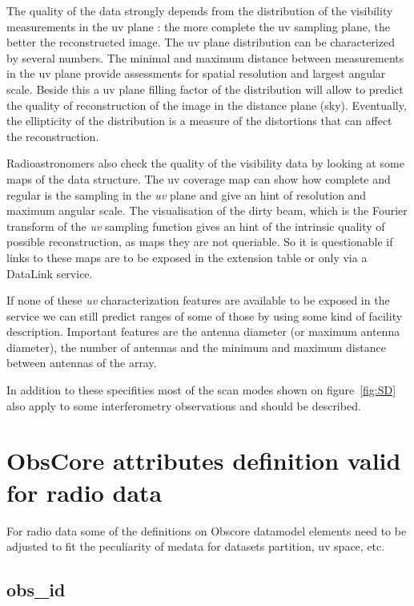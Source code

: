 \documentclass[11pt,a4paper]{ivoa}
\begin{document}
The quality of the data strongly depends from the distribution of the visibility measurements 
in the uv plane : the more complete the uv sampling plane, the better the reconstructed image. 
The uv plane distribution can be characterized by several numbers. 
The minimal and maximum distance between measurements in the uv plane provide assessments for 
spatial resolution and largest angular scale. 
Beside this a uv plane filling factor of the distribution will allow to predict the quality 
of reconstruction of the image in the distance plane (sky).
Eventually, the ellipticity of the distribution is a measure of the distortions that can 
affect the reconstruction.

Radioastronomers also check the quality of the visibility data by looking at some maps of 
the data structure. The uv coverage map can show how complete and regular is the sampling in 
the \emph{uv} plane and give an hint of resolution and maximum angular scale. 
The visualisation of the dirty beam, which is the Fourier transform of the \emph{uv} sampling 
function gives an hint of the intrinsic quality of possible reconstruction, as maps they are 
not queriable. So it is questionable if links to these maps are to be exposed in the extension 
table or only via a DataLink service. 

If none of these \emph{uv} characterization features are available to be exposed in the service 
we can still predict ranges of some of those by using some kind of facility description.  
Important features are the antenna diameter (or maximum antenna diameter), the number of 
antennas and the minimum and maximum distance between antennas of the array.

In addition to these specifities most of the scan modes shown on figure~\ref{fig:SD} also 
apply to some interferometry observations and should be described. 

\section{ObsCore attributes definition valid for radio data}
\label{sec:ObsCoreRadDef}

For radio data some of the definitions on Obscore datamodel elements need to be adjusted 
to fit the peculiarity of medata for datasets partition, uv space, etc.

\subsection{obs\_id}
\end{document}
